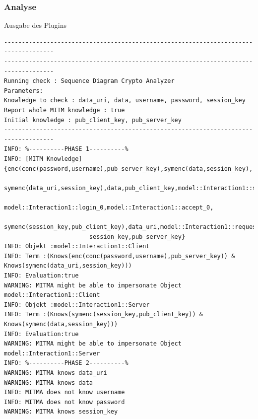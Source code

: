 \begin{frame}[c,fragile]

	\frametitle{Analyse}
	
\begin{block}{Ausgabe des Plugins}
\tiny{
\begin{verbatim}
------------------------------------------------------------------------------------
------------------------------------------------------------------------------------
Running check : Sequence Diagram Crypto Analyzer
Parameters:
Knowledge to check : data_uri, data, username, password, session_key
Report whole MITM knowledge : true
Initial knowledge : pub_client_key, pub_server_key
------------------------------------------------------------------------------------
INFO: %----------PHASE 1----------%
INFO: [MITM Knowledge] {enc(conc(password,username),pub_server_key),symenc(data,session_key),
                        symenc(data_uri,session_key),data,pub_client_key,model::Interaction1::send_data_0,
                        model::Interaction1::login_0,model::Interaction1::accept_0,
                        symenc(session_key,pub_client_key),data_uri,model::Interaction1::request_0,
                        session_key,pub_server_key}
INFO: Objekt :model::Interaction1::Client
INFO: Term :(Knows(enc(conc(password,username),pub_server_key)) & Knows(symenc(data_uri,session_key)))
INFO: Evaluation:true
WARNING: MITMA might be able to impersonate Object model::Interaction1::Client
INFO: Objekt :model::Interaction1::Server
INFO: Term :(Knows(symenc(session_key,pub_client_key)) & Knows(symenc(data,session_key)))
INFO: Evaluation:true
WARNING: MITMA might be able to impersonate Object model::Interaction1::Server
INFO: %----------PHASE 2----------%
WARNING: MITMA knows data_uri
WARNING: MITMA knows data
INFO: MITMA does not know username
INFO: MITMA does not know password
WARNING: MITMA knows session_key
\end{verbatim}
}
\end{block}

\end{frame}


